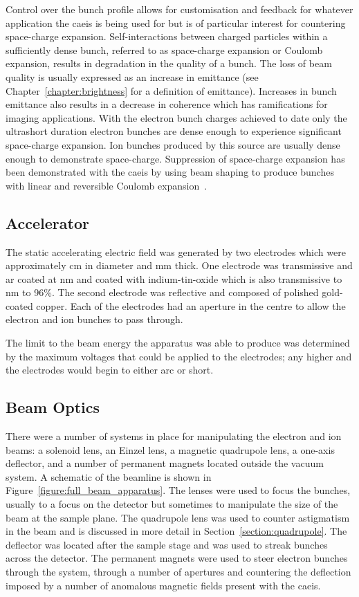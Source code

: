 Control over the bunch profile allows for customisation and feedback for whatever application the \gls{caeis} is being used for but is of particular interest for countering space-charge expansion.
Self-interactions between charged particles within a sufficiently dense bunch, referred to as space-charge expansion or Coulomb expansion, results in degradation in the quality of a bunch.
The loss of beam quality is usually expressed as an increase in emittance (see Chapter~\ref{chapter:brightness} for a definition of emittance).
Increases in bunch emittance also results in a decrease in coherence which has ramifications for imaging applications.
With the electron bunch charges achieved to date only the ultrashort duration electron bunches are dense enough to experience significant space-charge expansion.
Ion bunches produced by this source are usually dense enough to demonstrate space-charge.
Suppression of space-charge expansion has been demonstrated with the \gls{caeis} by using beam shaping to produce bunches with linear and reversible Coulomb expansion~\cite{luiten_how_2004,thompson_suppression_2016}.

\subsection{Accelerator}

The static accelerating electric field was generated by two electrodes which were approximately \unit[11]{cm} in diameter and \unit[4]{mm} thick.
One electrode was transmissive and \gls{ar} coated at \unit[780]{nm} and coated with indium-tin-oxide which is also transmissive to \unit[780]{nm} to 96\%.
The second electrode was reflective and composed of polished gold-coated copper.
Each of the electrodes had an aperture in the centre to allow the electron and ion bunches to pass through.

The limit to the beam energy the apparatus was able to produce was determined by the maximum voltages that could be applied to the electrodes; any higher and the electrodes would begin to either arc or short.

\subsection{Beam Optics}

There were a number of systems in place for manipulating the electron and ion beams: a solenoid lens, an Einzel lens, a magnetic quadrupole lens, a one-axis deflector, and a number of permanent magnets located outside the vacuum system.
A schematic of the beamline is shown in Figure~\ref{figure:full_beam_apparatus}.
The lenses were used to focus the bunches, usually to a focus on the detector but sometimes to manipulate the size of the beam at the sample plane.
The quadrupole lens was used to counter astigmatism in the beam and is discussed in more detail in Section~\ref{section:quadrupole}.
The deflector was located after the sample stage and was used to streak bunches across the detector.
The permanent magnets were used to steer electron bunches through the system, through a number of apertures and countering the deflection imposed by a number of anomalous magnetic fields present with the \gls{caeis}.

